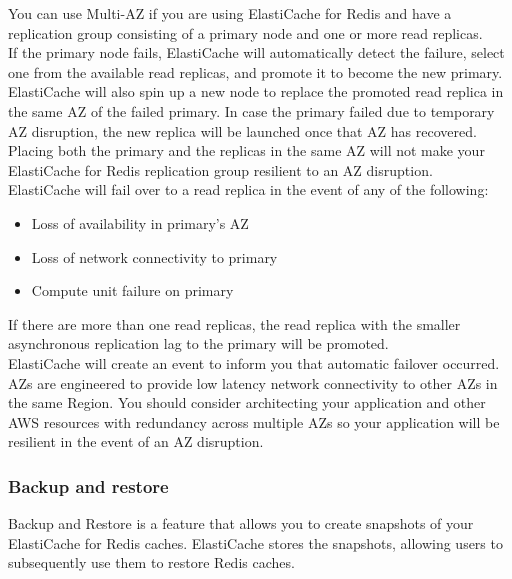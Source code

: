 \documentclass[12pt, letterpaper, twoside]{article}
\begin{document}
You can use Multi-AZ if you are using ElastiCache for Redis and have a replication group consisting of a primary node and one or more read 
replicas.\\
If the primary node fails, ElastiCache will automatically detect the failure, select one from the available read replicas, 
and promote it to become the new primary.\\
ElastiCache will also spin up a new node to replace the promoted read replica in the same AZ of the failed primary. In case 
the primary failed due to temporary AZ disruption, the new replica will be launched once that AZ has recovered.\\

Placing both the primary and the replicas in the same AZ will not make your ElastiCache for Redis replication group 
resilient to an AZ disruption.\\

ElastiCache will fail over to a read replica in the event of any of the following:
\begin{itemize}
\item Loss of availability in primary’s AZ
\item Loss of network connectivity to primary
\item Compute unit failure on primary
\end{itemize}

If there are more than one read replicas, the read replica with the smaller asynchronous replication lag to the primary 
will be promoted.\\

ElastiCache will create an event to inform you that automatic failover occurred.\\

AZs are engineered to provide low latency network connectivity to other AZs in the same Region. You should consider architecting
your application and other AWS resources with redundancy across multiple AZs so your application will be resilient in the 
event of an AZ disruption.\\

\subsubsection{Backup and restore}
Backup and Restore is a feature that allows you to create snapshots of your ElastiCache for Redis caches. ElastiCache stores 
the snapshots, allowing users to subsequently use them to restore Redis caches.\\
\end{document}
